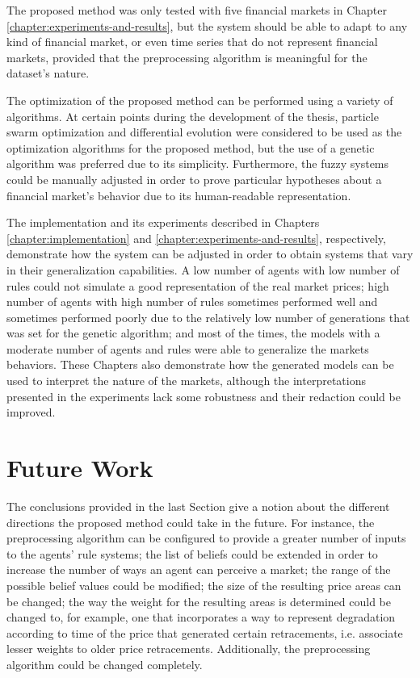 The proposed method was only tested with five financial markets in Chapter
\ref{chapter:experiments-and-results}, but the system should be able to adapt to
any kind of financial market, or even time series that do not represent
financial markets, provided that the preprocessing algorithm is meaningful for
the dataset's nature.

The optimization of the proposed method can be performed using a variety of
algorithms. At certain points during the development of the thesis, particle
swarm optimization and differential evolution were considered to be used as the
optimization algorithms for the proposed method, but the use of a genetic
algorithm was preferred due to its simplicity. Furthermore, the fuzzy systems
could be manually adjusted in order to prove particular hypotheses about a
financial market's behavior due to its human-readable representation.

The implementation and its experiments described in Chapters
\ref{chapter:implementation} and \ref{chapter:experiments-and-results},
respectively, demonstrate how the system can be adjusted in order to obtain
systems that vary in their generalization capabilities. A low number of
agents with low number of rules could not simulate a good representation of the
real market prices; high number of agents with high number of rules sometimes
performed well and sometimes performed poorly due to the relatively low number
of generations that was set for the genetic algorithm; and most of the times,
the models with a moderate number of agents and rules were able to generalize
the markets behaviors. These Chapters also demonstrate how the generated models
can be used to interpret the nature of the markets, although the interpretations
presented in the experiments lack some robustness and their redaction could be
improved.

\section{Future Work}
\label{section:future-work}

The conclusions provided in the last Section give a notion about the
different directions the proposed method could take in the future. For instance,
the preprocessing algorithm can be configured to provide a greater number of
inputs to the agents' rule systems; the list of beliefs could be extended in
order to increase the number of ways an agent can perceive a market; the range
of the possible belief values could be modified; the size of the resulting price
areas can be changed; the way the weight for the resulting areas is determined
could be changed to, for example, one that incorporates a way to represent
degradation according to time of the price that generated certain retracements,
i.e. associate lesser weights to older price retracements. Additionally, the
preprocessing algorithm could be changed completely.

